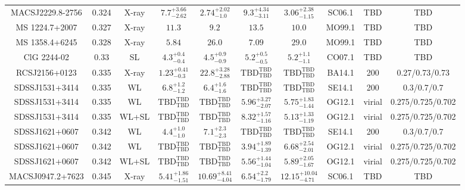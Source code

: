 \begin{table}
\begin{tabular}{cccccccccc}
MACSJ2229.8-2756 & 0.324 & X-ray & ${7.7}^{+3.66}_{-2.62}$ & ${2.74}^{+2.02}_{-1.0}$ & ${9.3}^{+4.34}_{-3.11}$ & ${3.06}^{+2.38}_{-1.15}$ & SC06.1 & TBD & TBD \\
MS 1224.7+2007 & 0.327 & X-ray & ${11.3}^{}_{}$ & ${9.2}^{}_{}$ & ${13.5}^{}_{}$ & ${10.0}^{}_{}$ & MO99.1 & TBD & TBD \\
MS 1358.4+6245 & 0.328 & X-ray & ${5.84}^{}_{}$ & ${26.0}^{}_{}$ & ${7.09}^{}_{}$ & ${29.0}^{}_{}$ & MO99.1 & TBD & TBD \\
ClG 2244-02 & 0.33 & SL & ${4.3}^{+0.4}_{-0.4}$ & ${4.5}^{+0.9}_{-0.9}$ & ${5.2}^{+0.5}_{-0.5}$ & ${5.2}^{+1.1}_{-1.1}$ & CO07.1 & TBD & TBD \\
RCSJ2156+0123 & 0.335 & X-ray & ${1.23}^{+0.41}_{-0.3}$ & ${22.8}^{+3.28}_{-2.88}$ & ${\mathrm{TBD}}^{\mathrm{TBD}}_{\mathrm{TBD}}$ & ${\mathrm{TBD}}^{\mathrm{TBD}}_{\mathrm{TBD}}$ & BA14.1 & 200 & 0.27/0.73/0.73 \\
SDSSJ1531+3414 & 0.335 & WL & ${6.8}^{+1.2}_{-1.2}$ & ${6.4}^{+1.6}_{-1.6}$ & ${\mathrm{TBD}}^{\mathrm{TBD}}_{\mathrm{TBD}}$ & ${\mathrm{TBD}}^{\mathrm{TBD}}_{\mathrm{TBD}}$ & SE14.1 & 200 & 0.3/0.7/0.7 \\
SDSSJ1531+3414 & 0.335 & WL & ${\mathrm{TBD}}^{\mathrm{TBD}}_{\mathrm{TBD}}$ & ${\mathrm{TBD}}^{\mathrm{TBD}}_{\mathrm{TBD}}$ & ${5.96}^{+3.27}_{-2.07}$ & ${5.75}^{+1.83}_{-1.44}$ & OG12.1 & virial & 0.275/0.725/0.702 \\
SDSSJ1531+3414 & 0.335 & WL+SL & ${\mathrm{TBD}}^{\mathrm{TBD}}_{\mathrm{TBD}}$ & ${\mathrm{TBD}}^{\mathrm{TBD}}_{\mathrm{TBD}}$ & ${8.32}^{+1.57}_{-1.16}$ & ${5.13}^{+1.33}_{-1.19}$ & OG12.1 & virial & 0.275/0.725/0.702 \\
SDSSJ1621+0607 & 0.342 & WL & ${4.4}^{+1.0}_{-1.0}$ & ${7.1}^{+2.3}_{-2.3}$ & ${\mathrm{TBD}}^{\mathrm{TBD}}_{\mathrm{TBD}}$ & ${\mathrm{TBD}}^{\mathrm{TBD}}_{\mathrm{TBD}}$ & SE14.1 & 200 & 0.3/0.7/0.7 \\
SDSSJ1621+0607 & 0.342 & WL & ${\mathrm{TBD}}^{\mathrm{TBD}}_{\mathrm{TBD}}$ & ${\mathrm{TBD}}^{\mathrm{TBD}}_{\mathrm{TBD}}$ & ${3.94}^{+1.89}_{-1.39}$ & ${6.68}^{+2.54}_{-2.01}$ & OG12.1 & virial & 0.275/0.725/0.702 \\
SDSSJ1621+0607 & 0.342 & WL+SL & ${\mathrm{TBD}}^{\mathrm{TBD}}_{\mathrm{TBD}}$ & ${\mathrm{TBD}}^{\mathrm{TBD}}_{\mathrm{TBD}}$ & ${5.56}^{+1.44}_{-1.04}$ & ${5.89}^{+2.05}_{-1.67}$ & OG12.1 & virial & 0.275/0.725/0.702 \\
MACSJ0947.2+7623 & 0.345 & X-ray & ${5.41}^{+1.86}_{-1.51}$ & ${10.69}^{+8.41}_{-4.04}$ & ${6.54}^{+2.2}_{-1.79}$ & ${12.15}^{+10.04}_{-4.71}$ & SC06.1 & TBD & TBD \\

\end{tabular}
\end{table}
